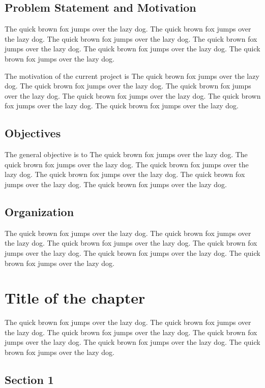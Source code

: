 \documentclass[11pt,a4paper]{report}
\begin{document}
\section{Problem Statement and Motivation}
\label{sec:motivation}
The quick brown fox jumps over the lazy dog. The quick brown fox jumps over the lazy dog. The quick brown fox jumps over the lazy dog. The quick brown fox jumps over the lazy dog. The quick brown fox jumps over the lazy dog. The quick brown fox jumps over the lazy dog.

The motivation of the current project is
The quick brown fox jumps over the lazy dog. The quick brown fox jumps over the lazy dog. The quick brown fox jumps over the lazy dog. The quick brown fox jumps over the lazy dog. The quick brown fox jumps over the lazy dog. The quick brown fox jumps over the lazy dog.

\section{Objectives}
\label{sec:name}
The general objective is to
The quick brown fox jumps over the lazy dog. The quick brown fox jumps over the lazy dog. The quick brown fox jumps over the lazy dog. The quick brown fox jumps over the lazy dog. The quick brown fox jumps over the lazy dog. The quick brown fox jumps over the lazy dog.

\section{Organization}
\label{sec:org}
The quick brown fox jumps over the lazy dog. The quick brown fox jumps over the lazy dog. The quick brown fox jumps over the lazy dog. The quick brown fox jumps over the lazy dog. The quick brown fox jumps over the lazy dog. The quick brown fox jumps over the lazy dog.

\chapter{Title of the chapter}
\label{cap:name1}

The quick brown fox jumps over the lazy dog. The quick brown fox jumps over the lazy dog. The quick brown fox jumps over the lazy dog. The quick brown fox jumps over the lazy dog. The quick brown fox jumps over the lazy dog. The quick brown fox jumps over the lazy dog.

\section{Section 1}
\label{sec:sec1}
\end{document}
